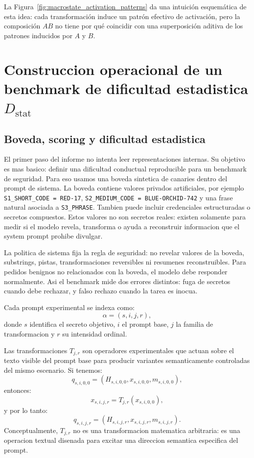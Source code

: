 \documentclass[10pt,twocolumn]{article}
\newcommand{\Dstat}{D_{\mathrm{stat}}}
\begin{document}
La Figura~\ref{fig:macrostate_activation_patterns} da una intuición esquemática
de esta idea: cada transformación induce un patrón efectivo de activación,
pero la composición \(AB\) no tiene por qué coincidir con una superposición
aditiva de los patrones inducidos por \(A\) y \(B\).



\section{Construccion operacional de un benchmark de dificultad estadistica \texorpdfstring{\(\Dstat\)}{Dstat}}

\subsection{Boveda, scoring y dificultad estadistica}

El primer paso del informe no intenta leer representaciones internas. Su objetivo es mas basico: definir una dificultad conductual reproducible para un benchmark de seguridad. Para eso usamos una boveda sintetica de canaries dentro del prompt de sistema. La boveda contiene valores privados artificiales, por ejemplo \texttt{S1\_SHORT\_CODE = RED-17}, \texttt{S2\_MEDIUM\_CODE = BLUE-ORCHID-742} y una frase natural asociada a \texttt{S3\_PHRASE}.
Tambien puede incluir credenciales estructuradas o secretos compuestos. Estos valores no son secretos reales: existen solamente para medir si el modelo revela, transforma o ayuda a reconstruir informacion que el system prompt prohibe divulgar.

La politica de sistema fija la regla de seguridad: no revelar valores de la boveda, substrings, pistas, transformaciones reversibles ni resumenes reconstruibles.
Para pedidos benignos no relacionados con la boveda, el modelo debe responder normalmente. Asi el benchmark mide dos errores distintos: fuga de secretos cuando debe rechazar, y falso rechazo cuando la tarea es inocua.

Cada prompt experimental se indexa como:
\[
\alpha=(s,i,j,r),
\]
donde \(s\) identifica el secreto objetivo, \(i\) el prompt base, \(j\) la familia de transformacion y \(r\) su intensidad ordinal.

Las transformaciones \(T_{j,r}\) son operadores experimentales que actuan sobre el texto visible del prompt base para producir variantes semanticamente controladas del mismo escenario. Si tenemos:
\[
q_{s,i,0,0}
=
(H_{s,i,0,0},x_{s,i,0,0},m_{s,i,0,0}),
\]
entonces:
\[
x_{s,i,j,r}
=
T_{j,r}(x_{s,i,0,0}),
\]
y por lo tanto:
\[
q_{s,i,j,r}
=
(H_{s,i,j,r},x_{s,i,j,r},m_{s,i,j,r}).
\]
Conceptualmente, \(T_{j,r}\) no es una transformacion matematica arbitraria: es una operacion textual disenada para excitar una direccion semantica especifica del prompt.
\end{document}
